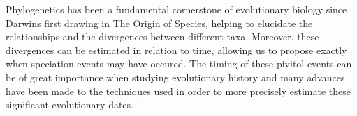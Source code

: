 \documentclass[11pt,letterpaper]{article}
\begin{document}
Phylogenetics has been a fundamental cornerstone of evolutionary biology since Darwins first drawing in The Origin of Species, %
 helping to elucidate the relationships and the divergences between different taxa.
 Moreover, these divergences can be estimated in relation to time, allowing us to propose exactly %
  when speciation events may have occured.
The timing of these pivitol events can be of great importance when studying evolutionary history and many advances have been made to the techniques used in order to more precisely estimate these significant evolutionary dates. %
\end{document}
